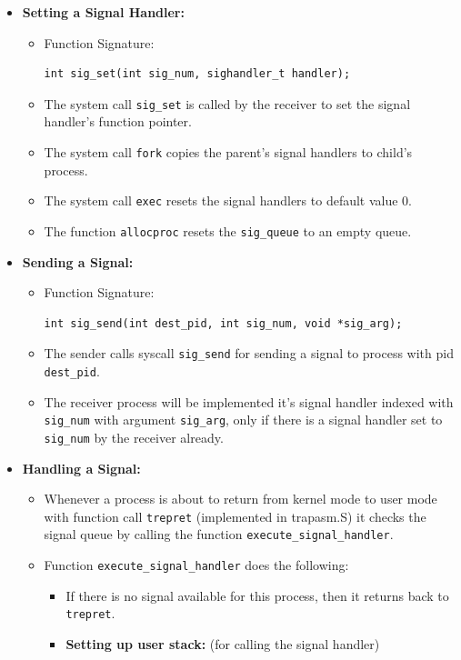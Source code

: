 \documentclass[a4 paper]{article}
\newcommand{\code}[1]{\texttt{#1}}
\begin{document}
\begin{itemize}
\item \textbf{Setting a Signal Handler:}
\begin{itemize}
  \item Function Signature: \begin{lstlisting}
int sig_set(int sig_num, sighandler_t handler);
  \end{lstlisting}
  \item The system call \code{sig\_set} is called by the receiver to set the signal handler's function pointer.
  \item The system call \code{fork} copies the parent's signal handlers to child's process.
  \item The system call \code{exec} resets the signal handlers to default value 0.
  \item The function \code{allocproc} resets the \code{sig\_queue} to an empty queue.
\end{itemize}

\item \textbf{Sending a Signal:}
\begin{itemize}
  \item Function Signature: \begin{lstlisting}
int sig_send(int dest_pid, int sig_num, void *sig_arg);
  \end{lstlisting}
  \item The sender calls syscall \code{sig\_send} for sending a signal to process with pid \code{dest\_pid}.
  \item The receiver process will be implemented it's signal handler indexed with \code{sig\_num} with argument \code{sig\_arg}, only if there is a signal handler set to \code{sig\_num} by the receiver already.
\end{itemize}

\item \textbf{Handling a Signal:}
\begin{itemize}
  \item Whenever a process is about to return from kernel mode to user mode with function call \code{trepret} (implemented in trapasm.S) it checks the signal queue by calling the function \code{execute\_signal\_handler}.
  \item Function \code{execute\_signal\_handler} does the following:
  \begin{itemize}
    \item If there is no signal available for this process, then it returns back to \code{trepret}.
    \item \textbf{Setting up user stack:} (for calling the signal handler)
  

\end{itemize}
\end{itemize}
\end{itemize}
\end{document}
